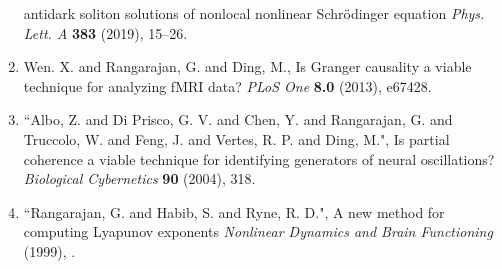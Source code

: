 \begin{enumerate}
antidark soliton solutions of nonlocal nonlinear {S}chr\"{o}dinger
equation {\em Phys. Lett. A} {\bf 383} (2019), 15--26.
\item Wen. X. and Rangarajan, G. and Ding, M., Is Granger causality a viable technique for analyzing fMRI data? {\em PLoS One} {\bf 8.0} (2013), e67428.
\item “Albo, Z. and Di Prisco, G. V. and Chen, Y. and Rangarajan, G. and Truccolo, W. and Feng, J. and Vertes, R. P. and Ding, M.", Is partial coherence a viable technique for identifying generators of neural oscillations? {\em Biological Cybernetics} {\bf 90} (2004), 318.
\item “Rangarajan, G. and Habib, S. and Ryne, R. D.", A new method for computing Lyapunov exponents {\em Nonlinear Dynamics and Brain Functioning} {\bf } (1999), .
\end{enumerate}

